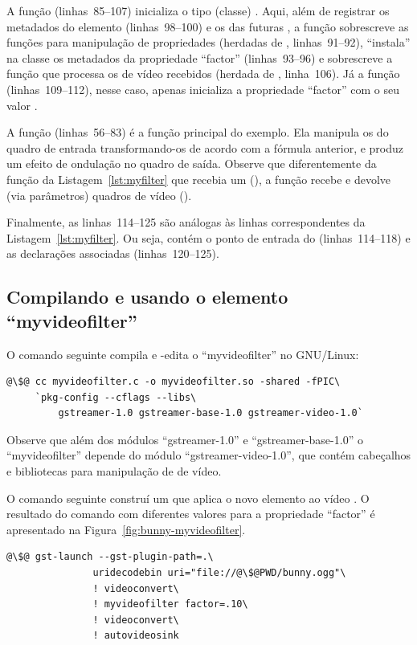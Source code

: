 \documentclass{SBCbookchapter}
\begin{document}
A função  (linhas~85--107) inicializa o
tipo (classe) .  Aqui, além de registrar os metadados do
elemento (linhas~98--100) e os  das futuras , a
função sobrescreve as funções para manipulação de propriedades (herdadas de
, linhas~91--92), ``instala'' na classe os metadados da
propriedade ``factor'' (linhas~93--96) e sobrescreve a função que processa
os  de vídeo recebidos (herdada de ,
linha~106).  Já a função  (linhas~109--112),
nesse caso, apenas inicializa a propriedade ``factor'' com o seu valor
.

A função  (linhas~56--83) é a função principal do
exemplo.  Ela manipula os  do quadro de entrada transformando-os
de acordo com a fórmula anterior, e produz um efeito de ondulação no quadro
de saída.  Observe que diferentemente da função  da
Listagem~\ref{lst:myfilter} que recebia um  (), a
função  recebe e devolve (via parâmetros) quadros
de vídeo ().

Finalmente, as linhas~114--125 são análogas às linhas correspondentes da
Listagem~\ref{lst:myfilter}.  Ou seja, contém o ponto de entrada do
 (linhas~114--118) e as declarações associadas (linhas~120--125).


\subsection*{Compilando e usando o elemento ``myvideofilter''}

O comando seguinte compila e -edita o  ``myvideofilter''
no GNU/Linux:
\begin{lstlisting}[style=command]
@\$@ cc myvideofilter.c -o myvideofilter.so -shared -fPIC\
     `pkg-config --cflags --libs\
         gstreamer-1.0 gstreamer-base-1.0 gstreamer-video-1.0`
\end{lstlisting}
Observe que além dos módulos ``gstreamer-1.0'' e ``gstreamer-base-1.0'' o
\en{plugin} ``myvideofilter'' depende do módulo ``gstreamer-video-1.0'', que
contém cabeçalhos e bibliotecas para manipulação de \en{buffers} de vídeo.

O comando seguinte construí um \en{pipeline} que aplica o novo elemento ao
vídeo .  O resultado do comando com diferentes valores
para a propriedade ``factor'' é apresentado na
Figura~\ref{fig:bunny-myvideofilter}.
\begin{lstlisting}[style=command]
@\$@ gst-launch --gst-plugin-path=.\
               uridecodebin uri="file://@\$@PWD/bunny.ogg"\
               ! videoconvert\
               ! myvideofilter factor=.10\
               ! videoconvert\
               ! autovideosink
\end{lstlisting}
\end{document}
